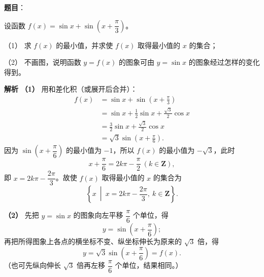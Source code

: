 \begin{answer}

\textbf{题目}：

设函数 $f(x)=\sin x+\sin\left(x+\dfrac\pi3\right)$。

（1） 求 $f(x)$ 的最小值，并求使 $f(x)$ 取得最小值的 $x$ 的集合；

（2） 不画图，说明函数 $y=f(x)$ 的图象可由 $y=\sin x$ 的图象经过怎样的变化得到。

\textbf{解析}
\textbf{（1）} 用和差化积（或展开后合并）：
\nopagebreak[4]
\[\begin{aligned}
f(x)&=\sin x+\sin\left(x+\frac\pi3\right)\\
&=\sin x+\frac12\sin x+\frac{\sqrt3}2\cos x\\
&=\frac32\sin x+\frac{\sqrt3}2\cos x\\
&=\sqrt3\sin\left(x+\frac\pi6\right).
\end{aligned}\]
因为 $\sin\left(x+\dfrac\pi6\right)$ 的最小值为 $-1$，所以 $f(x)$ 的最小值为 $-\sqrt3$，此时
\nopagebreak[4]
\[x+\frac\pi6=2k\pi-\frac\pi2\ (k\in\mathbf Z),\]
即 $x=2k\pi-\dfrac{2\pi}3$。故使 $f(x)$ 取得最小值的 $x$ 的集合为
\nopagebreak[4]
\[\left\{x\ \middle|\ x=2k\pi-\frac{2\pi}3,\ k\in\mathbf Z\right\}.\]

\textbf{（2）} 先把 $y=\sin x$ 的图象向左平移 $\dfrac\pi6$ 个单位，得
\nopagebreak[4]
\[y=\sin\left(x+\frac\pi6\right);\]
再把所得图象上各点的横坐标不变、纵坐标伸长为原来的 $\sqrt3$ 倍，得
\nopagebreak[4]
\[y=\sqrt3\sin\left(x+\frac\pi6\right)=f(x).\]
（也可先纵向伸长 $\sqrt3$ 倍再左移 $\dfrac\pi6$ 个单位，结果相同。）



\end{answer}
